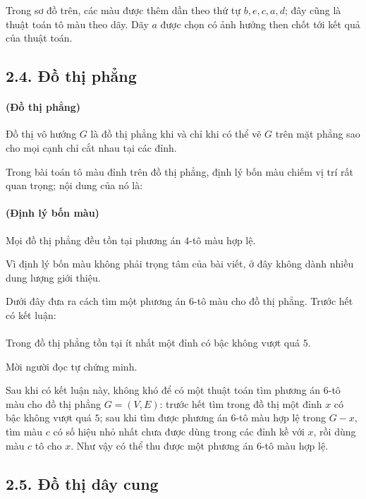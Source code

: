\documentclass[11pt]{article}
\begin{document}
Trong sơ đồ trên, các màu được thêm dần theo thứ tự \(b,e,c,a,d\); đây cũng là
thuật toán tô màu theo dãy. Dãy \(a\) được chọn có ảnh hưởng then chốt tới kết
quả của thuật toán.

\subsection*{2.4. Đồ thị phẳng}

\paragraph{ (Đồ thị phẳng)}
Đồ thị vô hướng \(G\) là đồ thị phẳng khi và chỉ khi có thể vẽ \(G\) trên mặt
phẳng sao cho mọi cạnh chỉ cắt nhau tại các đỉnh.

Trong bài toán tô màu đỉnh trên đồ thị phẳng, định lý bốn màu chiếm vị trí rất
quan trọng; nội dung của nó là:

\paragraph{ (Định lý bốn màu)}
Mọi đồ thị phẳng đều tồn tại phương án \(4\)-tô màu hợp lệ.

Vì định lý bốn màu không phải trọng tâm của bài viết, ở đây không dành nhiều
dung lượng giới thiệu.

Dưới đây đưa ra cách tìm một phương án \(6\)-tô màu cho đồ thị phẳng. Trước
hết có kết luận:

\paragraph{}
Trong đồ thị phẳng tồn tại ít nhất một đỉnh có bậc không vượt quá \(5\).

Mời người đọc tự chứng minh.

Sau khi có kết luận này, không khó để có một thuật toán tìm phương án
\(6\)-tô màu cho đồ thị phẳng \(G=(V,E)\): trước hết tìm trong đồ thị một đỉnh
\(x\) có bậc không vượt quá \(5\); sau khi tìm được phương án \(6\)-tô màu hợp
lệ trong \(G-x\), tìm màu \(c\) có số hiệu nhỏ nhất chưa được dùng trong các
đỉnh kề với \(x\), rồi dùng màu \(c\) tô cho \(x\). Như vậy có thể thu được
một phương án \(6\)-tô màu hợp lệ.

\subsection*{2.5. Đồ thị dây cung}
\end{document}
